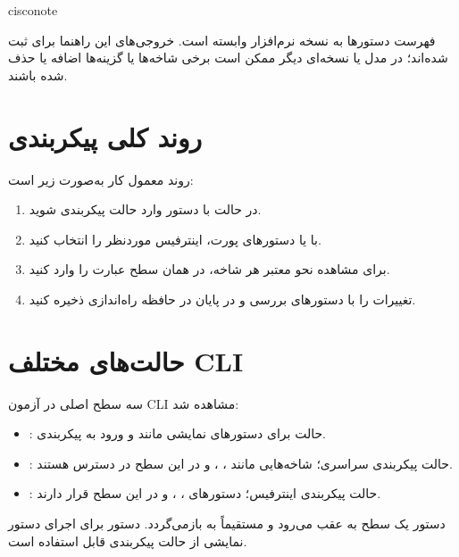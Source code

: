 \documentclass[11pt,letterpaper]{report}
\newenvironment{notebox}[1]{%
	\begin{noticebox}[title={\textbf{\faInfoCircle\ #1}}]{cisconote}
	}{%
	\end{noticebox}
}
\begin{document}
	\begin{notebox}{نکته درباره نسخه نرم‌افزار}
		فهرست دستورها به نسخه نرم‌افزار وابسته است. خروجی‌های این راهنما
		برای  ثبت شده‌اند؛ در مدل یا نسخه‌ای دیگر
		ممکن است برخی شاخه‌ها یا گزینه‌ها اضافه یا حذف شده باشند.
	\end{notebox}

	\section{روند کلی پیکربندی}
	روند معمول کار به‌صورت زیر است:
	\begin{enumerate}
		\item در حالت  با دستور 
			وارد حالت پیکربندی شوید.
		\item با  یا دستورهای پورت، اینترفیس
			موردنظر را انتخاب کنید.
		\item برای مشاهده نحو معتبر هر شاخه، در همان سطح عبارت
			 را وارد کنید.
		\item تغییرات را با دستورهای  بررسی و در پایان در
			حافظه راه‌اندازی ذخیره کنید.
	\end{enumerate}

	\section{حالت‌های مختلف CLI}
	سه سطح اصلی در آزمون CLI مشاهده شد:
	\begin{itemize}
		\item {}: حالت  برای دستورهای
		نمایشی مانند  و ورود به پیکربندی.
		\item {}: حالت پیکربندی سراسری؛ شاخه‌هایی
		مانند ، ،  و 
		در این سطح در دسترس هستند.
		\item {}: حالت پیکربندی اینترفیس؛
		دستورهای ، ،  و 
		در این سطح قرار دارند.
	\end{itemize}
	دستور  یک سطح به عقب می‌رود و  مستقیماً به
	 بازمی‌گردد. دستور  برای
	اجرای دستور نمایشی از حالت پیکربندی قابل استفاده است.
\end{document}

